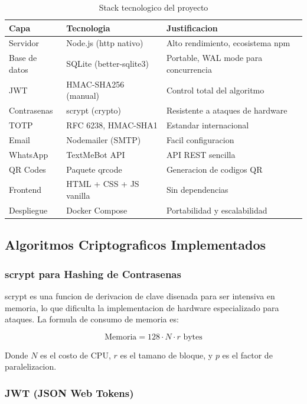 \documentclass[12pt,a4paper]{article}
\begin{document}
\begin{table}[H]
\centering
\caption{Stack tecnologico del proyecto}
\begin{tabular}{@{}p{2.5cm}p{4cm}p{5.5cm}@{}}
\toprule
\textbf{Capa} & \textbf{Tecnologia} & \textbf{Justificacion} \\
\midrule
Servidor & Node.js (http nativo) & Alto rendimiento, ecosistema npm \\
Base de datos & SQLite (better-sqlite3) & Portable, WAL mode para concurrencia \\
JWT & HMAC-SHA256 (manual) & Control total del algoritmo \\
Contrasenas & scrypt (crypto) & Resistente a ataques de hardware \\
TOTP & RFC 6238, HMAC-SHA1 & Estandar internacional \\
Email & Nodemailer (SMTP) & Facil configuracion \\
WhatsApp & TextMeBot API & API REST sencilla \\
QR Codes & Paquete qrcode & Generacion de codigos QR \\
Frontend & HTML + CSS + JS vanilla & Sin dependencias \\
Despliegue & Docker Compose & Portabilidad y escalabilidad \\
\bottomrule
\end{tabular}
\end{table}

\subsection{Algoritmos Criptograficos Implementados}

\subsubsection{scrypt para Hashing de Contrasenas}

scrypt es una funcion de derivacion de clave disenada para ser intensiva en memoria, lo que dificulta la implementacion de hardware especializado para ataques. La formula de consumo de memoria es:

\begin{equation}
\text{Memoria} = 128 \cdot N \cdot r \text{ bytes}
\end{equation}

Donde $N$ es el costo de CPU, $r$ es el tamano de bloque, y $p$ es el factor de paralelizacion.

\subsubsection{JWT (JSON Web Tokens)}
\end{document}
